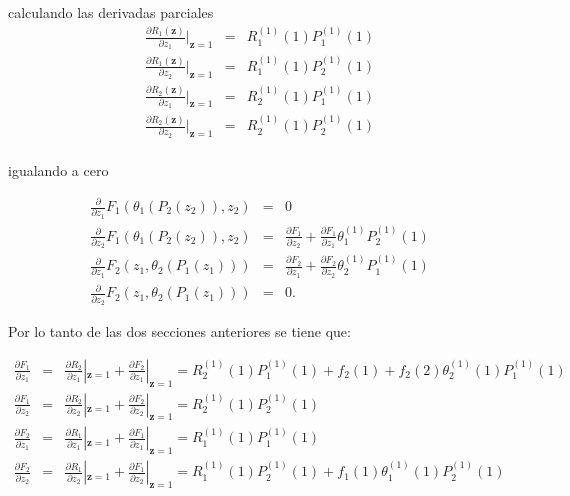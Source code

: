 \documentclass{article}
\numberwithin{equation}{section}
\begin{document}
calculando las derivadas parciales 
\begin{eqnarray*}
\frac{\partial R_{1}\left(\mathbf{z}\right)}{\partial
z_{1}}|_{\mathbf{z}=1}&=&R_{1}^{(1)}\left(1\right)P_{1}^{(1)}\left(1\right)\\
\frac{\partial R_{1}\left(\mathbf{z}\right)}{\partial
z_{2}}|_{\mathbf{z}=1}&=&R_{1}^{(1)}\left(1\right)P_{2}^{(1)}\left(1\right)\\
\frac{\partial R_{2}\left(\mathbf{z}\right)}{\partial
z_{1}}|_{\mathbf{z}=1}&=&R_{2}^{(1)}\left(1\right)P_{1}^{(1)}\left(1\right)\\
\frac{\partial R_{2}\left(\mathbf{z}\right)}{\partial
z_{2}}|_{\mathbf{z}=1}&=&R_{2}^{(1)}\left(1\right)P_{2}^{(1)}\left(1\right)\\
\end{eqnarray*}

igualando a cero

\begin{eqnarray*}
\frac{\partial}{\partial
z_{1}}F_{1}\left(\theta_{1}\left(P_{2}\left(z_{2}\right)\right),z_{2}\right)&=&0\\
\frac{\partial}{\partial
z_{2}}F_{1}\left(\theta_{1}\left(P_{2}\left(z_{2}\right)\right),z_{2}\right)&=&\frac{\partial
F_{1}}{\partial z_{2}}+\frac{\partial F_{1}}{\partial
z_{1}}\theta_{1}^{(1)}P_{2}^{(1)}\left(1\right)\\
\frac{\partial}{\partial
z_{1}}F_{2}\left(z_{1},\theta_{2}\left(P_{1}\left(z_{1}\right)\right)\right)&=&\frac{\partial
F_{2}}{\partial z_{1}}+\frac{\partial F_{2}}{\partial
z_{2}}\theta_{2}^{(1)}P_{1}^{(1)}\left(1\right)\\
\frac{\partial}{\partial
z_{2}}F_{2}\left(z_{1},\theta_{2}\left(P_{1}\left(z_{1}\right)\right)\right)&=&0.
\end{eqnarray*}


Por lo tanto de las dos secciones anteriores se tiene que:


\begin{eqnarray*}
\frac{\partial F_{1}}{\partial z_{1}}&=&\frac{\partial
R_{2}}{\partial z_{1}}|_{\mathbf{z}=1}+\frac{\partial F_{2}}{\partial z_{1}}|_{\mathbf{z}=1}=R_{2}^{(1)}\left(1\right)P_{1}^{(1)}\left(1\right)+f_{2}\left(1\right)+f_{2}\left(2\right)\theta_{2}^{(1)}\left(1\right)P_{1}^{(1)}\left(1\right)\\
\frac{\partial F_{1}}{\partial z_{2}}&=&\frac{\partial
R_{2}}{\partial z_{2}}|_{\mathbf{z}=1}+\frac{\partial F_{2}}{\partial z_{2}}|_{\mathbf{z}=1}=R_{2}^{(1)}\left(1\right)P_{2}^{(1)}\left(1\right)\\
\frac{\partial F_{2}}{\partial z_{1}}&=&\frac{\partial
R_{1}}{\partial z_{1}}|_{\mathbf{z}=1}+\frac{\partial F_{1}}{\partial z_{1}}|_{\mathbf{z}=1}=R_{1}^{(1)}\left(1\right)P_{1}^{(1)}\left(1\right)\\
\frac{\partial F_{2}}{\partial z_{2}}&=&\frac{\partial
R_{1}}{\partial z_{2}}|_{\mathbf{z}=1}+\frac{\partial F_{1}}{\partial z_{2}}|_{\mathbf{z}=1}
=R_{1}^{(1)}\left(1\right)P_{2}^{(1)}\left(1\right)+f_{1}\left(1\right)\theta_{1}^{(1)}\left(1\right)P_{2}^{(1)}\left(1\right)\\
\end{eqnarray*}
\end{document}
